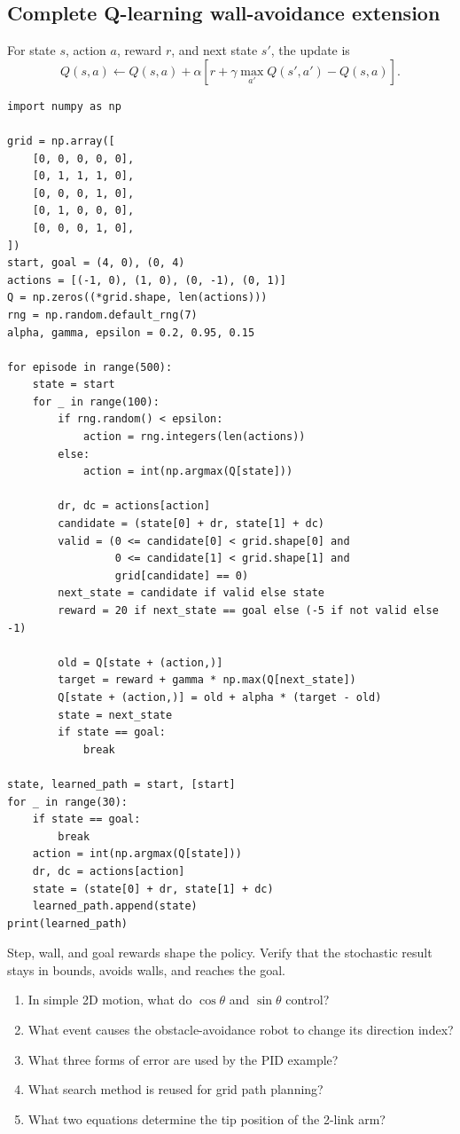 \subsection{Complete Q-learning wall-avoidance extension}

For state \(s\), action \(a\), reward \(r\), and next state \(s'\), the update is
\[
Q(s,a)\leftarrow Q(s,a)+\alpha
\left[r+\gamma\max_{a'}Q(s',a')-Q(s,a)\right].
\]

\begin{lstlisting}[style=mlpython]
import numpy as np

grid = np.array([
    [0, 0, 0, 0, 0],
    [0, 1, 1, 1, 0],
    [0, 0, 0, 1, 0],
    [0, 1, 0, 0, 0],
    [0, 0, 0, 1, 0],
])
start, goal = (4, 0), (0, 4)
actions = [(-1, 0), (1, 0), (0, -1), (0, 1)]
Q = np.zeros((*grid.shape, len(actions)))
rng = np.random.default_rng(7)
alpha, gamma, epsilon = 0.2, 0.95, 0.15

for episode in range(500):
    state = start
    for _ in range(100):
        if rng.random() < epsilon:
            action = rng.integers(len(actions))
        else:
            action = int(np.argmax(Q[state]))

        dr, dc = actions[action]
        candidate = (state[0] + dr, state[1] + dc)
        valid = (0 <= candidate[0] < grid.shape[0] and
                 0 <= candidate[1] < grid.shape[1] and
                 grid[candidate] == 0)
        next_state = candidate if valid else state
        reward = 20 if next_state == goal else (-5 if not valid else -1)

        old = Q[state + (action,)]
        target = reward + gamma * np.max(Q[next_state])
        Q[state + (action,)] = old + alpha * (target - old)
        state = next_state
        if state == goal:
            break

state, learned_path = start, [start]
for _ in range(30):
    if state == goal:
        break
    action = int(np.argmax(Q[state]))
    dr, dc = actions[action]
    state = (state[0] + dr, state[1] + dc)
    learned_path.append(state)
print(learned_path)
\end{lstlisting}

Step, wall, and goal rewards shape the policy. Verify that the stochastic result stays in bounds, avoids walls, and reaches the goal.



\clearpage
\begin{quickcheck}
\begin{enumerate}
  \item In simple 2D motion, what do \(\cos\theta\) and \(\sin\theta\) control?
  \item What event causes the obstacle-avoidance robot to change its direction index?
  \item What three forms of error are used by the PID example?
  \item What search method is reused for grid path planning?
  \item What two equations determine the tip position of the 2-link arm?
\end{enumerate}
\end{quickcheck}

